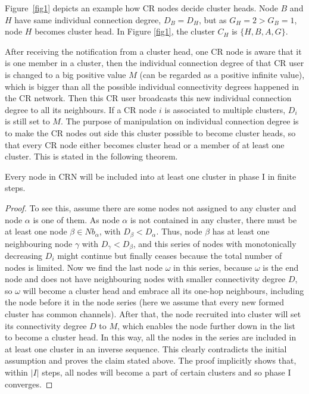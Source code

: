 Figure~\ref{fig1} depicts an example how CR nodes decide cluster heads. 
Node $B$ and $H$ have same individual connection degree, $D_B=D_H$, but as $G_H=2>G_B=1$, node $H$ becomes cluster head.
In Figure \ref{fig1}, the cluster $C_H$ is $\{H, B, A, G\}$.

After receiving the notification from a cluster head, one CR node is aware that it is one member in a cluster, then the individual connection degree of that CR user is changed to a big positive value $M$ (can be regarded as a positive infinite value), which is bigger than all the possible individual connectivity degrees happened in the CR network.
Then this CR user broadcasts this new individual connection degree to all its neighbours. 
If a CR node $i$ is associated to multiple clusters, $D_i$ is still set to $M$. %
The purpose of manipulation on individual connection degree is to make the CR nodes out side this cluster possible to become cluster heads, so that every CR node either becomes cluster head or a member of at least one cluster.
This is stated in the following theorem.
 
\begin{lemma}
\label{lemma}
Every node in CRN will be included into at least one cluster in phase I in finite steps.
\end{lemma}

\begin{proof}
To see this, assume there are some nodes not assigned to any cluster and node $\alpha$ is one of them. As node $\alpha$ is not contained in any cluster, there must be at least one node $\beta\in Nb_\alpha$, with $D_{\beta} < D_{\alpha}$. Thus, node $\beta$ has at least one neighbouring node $\gamma$ with $D_{\gamma}<D_{\beta}$, and this series of nodes with monotonically decreasing $D_i$ might continue but finally ceases because the total number of nodes is limited. Now we find the last node $\omega$ in this series, because $\omega$ is the end node and does not have neighbouring nodes with smaller connectivity degree $D$, so $\omega$ will become a cluster head and embrace all its one-hop neighbours, including the node before it in the node series (here we assume that every new formed cluster has common channels). After that, the node recruited into cluster will set its connectivity degree $D$ to $M$, which enables the node further down in the list to become a cluster head. In this way, all the nodes in the series are included in at least one cluster in an inverse sequence. This clearly contradicts the initial assumption and proves the claim stated above. The proof implicitly shows that, within $\vert I \vert$ steps, all nodes will become a part of certain clusters and so phase I converges.
\end{proof}





